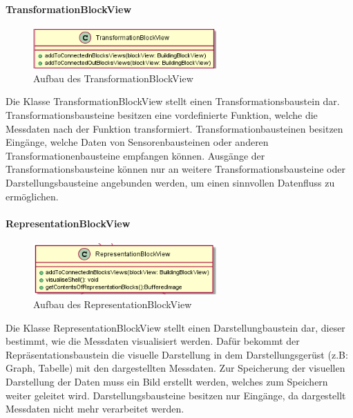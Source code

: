 \documentclass[parskip=full]{scrartcl}
\begin{document}
\paragraph{TransformationBlockView}

\begin{figure}[htbp]
	\begin{center}
		\includegraphics[width = 7cm]{Grafiken/View/TransformationBlockView.png}
		\caption{Aufbau des TransformationBlockView}
		\label{Entwurf_Grob}
	\end{center}
\end{figure}

Die Klasse TransformationBlockView stellt einen Transformationsbaustein dar. Transformationsbausteine besitzen eine vordefinierte Funktion, welche die Messdaten nach der Funktion transformiert. Transformationbausteinen besitzen Eingänge, welche Daten von Sensorenbausteinen oder anderen Transformationenbausteine empfangen können. Ausgänge der Transformationsbausteine können nur an weitere Transformationsbausteine oder Darstellungsbausteine angebunden werden, um einen sinnvollen Datenfluss zu ermöglichen.

\paragraph{RepresentationBlockView} 

\begin{figure}[htbp]
	\begin{center}
		\includegraphics[width = 7cm]{Grafiken/View/RepresentationBlockView.png}
		\caption{Aufbau des RepresentationBlockView}
		\label{Entwurf_Grob}
	\end{center}
\end{figure}

Die Klasse RepresentationBlockView stellt einen Darstellungbaustein dar, dieser bestimmt, wie die Messdaten visualisiert werden. Dafür bekommt der Repräsentationsbaustein die visuelle Darstellung in dem Darstellungsgerüst (z.B: Graph, Tabelle) mit den dargestellten Messdaten.
Zur Speicherung der visuellen Darstellung der Daten muss ein Bild erstellt werden, welches zum Speichern weiter geleitet wird.
Darstellungsbausteine besitzen nur Eingänge, da dargestellt Messdaten nicht mehr verarbeitet werden. 
\end{document}
